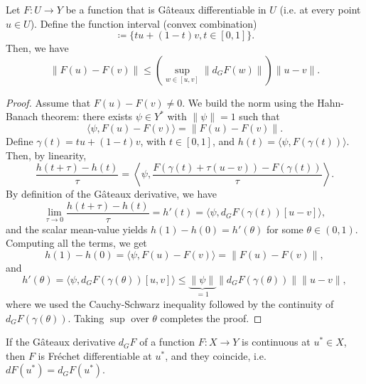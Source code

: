 \begin{theorem}\label{thm:mean-value-banach}
Let $F:U\to Y$ be a function that is Gâteaux differentiable in $U$ (i.e. at every point $u\in U$). Define the function interval (convex combination)
\begin{equation*}
    [u,v] \coloneqq \{tu+(1-t)v, t\in[0,1]\}.
\end{equation*}
Then, we have
\begin{equation*}
    \|F(u)-F(v)\| \leq \left(\sup_{w\in[u,v]} \|d_G F(w)\|\right) \|u-v\|. 
\end{equation*}
\end{theorem}
\begin{proof}
    Assume that $F(u)-F(v)\neq 0$. We build the norm using the Hahn-Banach theorem: there exists $\psi \in Y^*$ with $\|\psi\|=1$ such that 
    \begin{equation*}
        \langle \psi, F(u)-F(v)\rangle = \|F(u)-F(v)\|. 
    \end{equation*}    
    Define $\gamma(t) = tu + (1-t)v$, with $t\in [0,1]$, and $h(t)=\langle \psi, F(\gamma(t))\rangle$. Then, by linearity, 
    \begin{equation*}
        \frac{h(t+\tau) - h(t)}{\tau} = \left\langle \psi, \frac{F(\gamma(t) + \tau(u-v)) - F(\gamma(t))}{\tau} \right\rangle.
    \end{equation*}
    By definition of the Gâteaux derivative, we have
    \begin{equation*}
        \lim_{\tau\to 0} \frac{h(t+\tau) - h(t)}{\tau} = h'(t) = \langle \psi, d_G F(\gamma(t)) [u-v]\rangle, 
    \end{equation*}
    and the scalar mean-value yields $h(1)-h(0) = h'(\theta)$ for some $\theta\in(0,1)$. Computing all the terms, we get
    \begin{equation*}
        h(1)-h(0) = \langle \psi, F(u)-F(v)\rangle = \|F(u)-F(v)\|,
    \end{equation*}
    and 
    \begin{equation*}
        h'(\theta) = \langle \psi, d_G F(\gamma(\theta))[u,v]\rangle \leq \underbrace{\|\psi\|}_{=1} \|d_G F(\gamma(\theta))\| \|u-v\|,
    \end{equation*}
    where we used the Cauchy-Schwarz inequality followed by the continuity of $d_G F(\gamma(\theta))$. Taking $\sup$ over $\theta$ completes the proof. 
\end{proof}
\begin{theorem}\label{thm:frechet-gateaux-equivalence}
    If the Gâteaux derivative $d_G F$ of a function $F:X\to Y$ is continuous at $u^*\in X$, then $F$ is Fréchet differentiable at $u^*$, and they coincide, i.e. $dF(u^*) = d_G F(u^*)$.
\end{theorem}
